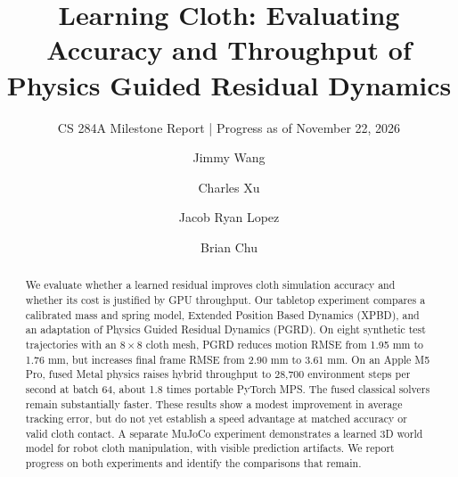 \documentclass[sigconf]{acmart}
\begin{document}
\title[Learning Cloth]{Learning Cloth: Evaluating Accuracy and Throughput of Physics Guided Residual Dynamics}
\subtitle{CS 284A Milestone Report | Progress as of November 22, 2026}
\author{Jimmy Wang}

\author{Charles Xu}

\author{Jacob Ryan Lopez}

\author{Brian Chu}


\renewcommand{\shortauthors}{Wang et al.}
\begin{abstract}
We evaluate whether a learned residual improves cloth simulation accuracy and whether its cost is justified by GPU throughput. Our tabletop experiment compares a calibrated mass and spring model, Extended Position Based Dynamics (XPBD), and an adaptation of Physics Guided Residual Dynamics (PGRD). On eight synthetic test trajectories with an $8\times8$ cloth mesh, PGRD reduces motion RMSE from 1.95 mm to 1.76 mm, but increases final frame RMSE from 2.90 mm to 3.61 mm. On an Apple M5 Pro, fused Metal physics raises hybrid throughput to 28,700 environment steps per second at batch 64, about 1.8 times portable PyTorch MPS. The fused classical solvers remain substantially faster. These results show a modest improvement in average tracking error, but do not yet establish a speed advantage at matched accuracy or valid cloth contact. A separate MuJoCo experiment demonstrates a learned 3D world model for robot cloth manipulation, with visible prediction artifacts. We report progress on both experiments and identify the comparisons that remain.
\end{abstract}
\end{document}

